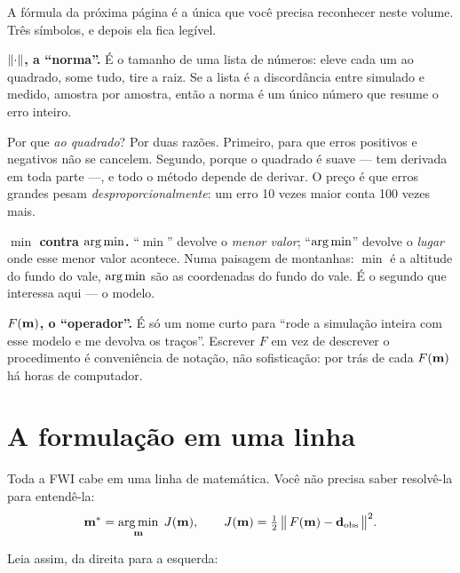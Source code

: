 \documentclass[11pt,a4paper,oneside]{report}
\begin{document}
\begin{matematica}
A f\'ormula da pr\'oxima p\'agina \'e a \'unica que voc\^e precisa
reconhecer neste volume. Tr\^es s\'imbolos, e depois ela fica leg\'ivel.

\textbf{$\lVert \cdot \rVert$, a ``norma''.} \'E o tamanho de uma lista de
n\'umeros: eleve cada um ao quadrado, some tudo, tire a raiz. Se a lista \'e a
discord\^ancia entre simulado e medido, amostra por amostra, ent\~ao a norma
\'e um \'unico n\'umero que resume o erro inteiro.

Por que \emph{ao quadrado}? Por duas raz\~oes. Primeiro, para que erros
positivos e negativos n\~ao se cancelem. Segundo, porque o quadrado \'e
suave --- tem derivada em toda parte ---, e todo o m\'etodo depende de
derivar. O pre\c{c}o \'e que erros grandes pesam \emph{desproporcionalmente}:
um erro 10 vezes maior conta 100 vezes mais.

\textbf{$\min$ contra $\operatorname*{arg\,min}$.} ``$\min$'' devolve o \emph{menor valor};
``$\operatorname*{arg\,min}$'' devolve o \emph{lugar} onde esse menor valor acontece. Numa
paisagem de montanhas: $\min$ \'e a altitude do fundo do vale, $\operatorname*{arg\,min}$ s\~ao
as coordenadas do fundo do vale. \'E o segundo que interessa aqui --- o
modelo.

\textbf{$F(\mathbf{m})$, o ``operador''.} \'E s\'o um nome curto para ``rode a
simula\c{c}\~ao inteira com esse modelo e me devolva os tra\c{c}os''. Escrever
$F$ em vez de descrever o procedimento \'e conveni\^encia de nota\c{c}\~ao,
n\~ao sofistica\c{c}\~ao: por tr\'as de cada $F(\mathbf{m})$ h\'a horas de
computador.
\end{matematica}

\section{A formula\c{c}\~ao em uma linha}

Toda a FWI cabe em uma linha de matem\'atica. Voc\^e n\~ao precisa saber
resolv\^e-la para entend\^e-la:
\begin{equation}
\mathbf{m}^{*} = \operatorname*{arg\,min}_{\mathbf{m}}\; J(\mathbf{m}),
\qquad
J(\mathbf{m}) = \tfrac{1}{2}\,\bigl\|\,F(\mathbf{m}) - \mathbf{d}_{\mathrm{obs}} \,\bigr\|^{2}.
\label{eq:fwi1}
\end{equation}

Leia assim, da direita para a esquerda:
\end{document}
